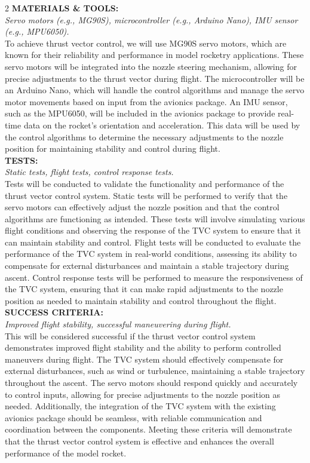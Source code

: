 \documentclass[10pt]{report}
\begin{document}
\begin{multicols}{2}
  \noindent \textbf{\large MATERIALS \& TOOLS:}\\  \textit{Servo motors (e.g., MG90S), microcontroller (e.g., Arduino Nano), IMU sensor (e.g., MPU6050).}\\
  To achieve thrust vector control, we will use MG90S servo motors, which are known for their reliability and performance in model rocketry applications. These servo motors will be integrated into the nozzle steering mechanism, allowing for precise adjustments to the thrust vector during flight. The microcontroller will be an Arduino Nano, which will handle the control algorithms and manage the servo motor movements based on input from the avionics package. An IMU sensor, such as the MPU6050, will be included in the avionics package to provide real-time data on the rocket's orientation and acceleration. This data will be used by the control algorithms to determine the necessary adjustments to the nozzle position for maintaining stability and control during flight. \\

  \noindent \textbf{\large TESTS:}\\  \textit{Static tests, flight tests, control response tests.}\\
  Tests will be conducted to validate the functionality and performance of the thrust vector control system. Static tests will be performed to verify that the servo motors can effectively adjust the nozzle position and that the control algorithms are functioning as intended. These tests will involve simulating various flight conditions and observing the response of the TVC system to ensure that it can maintain stability and control. Flight tests will be conducted to evaluate the performance of the TVC system in real-world conditions, assessing its ability to compensate for external disturbances and maintain a stable trajectory during ascent. Control response tests will be performed to measure the responsiveness of the TVC system, ensuring that it can make rapid adjustments to the nozzle position as needed to maintain stability and control throughout the flight. \\

  \noindent \textbf{\large SUCCESS CRITERIA:}\\  \textit{Improved flight stability, successful maneuvering during flight.}\\
  This will be considered successful if the thrust vector control system demonstrates improved flight stability and the ability to perform controlled maneuvers during flight. The TVC system should effectively compensate for external disturbances, such as wind or turbulence, maintaining a stable trajectory throughout the ascent. The servo motors should respond quickly and accurately to control inputs, allowing for precise adjustments to the nozzle position as needed. Additionally, the integration of the TVC system with the existing avionics package should be seamless, with reliable communication and coordination between the components. Meeting these criteria will demonstrate that the thrust vector control system is effective and enhances the overall performance of the model rocket. \\


\end{multicols}
\end{document}

